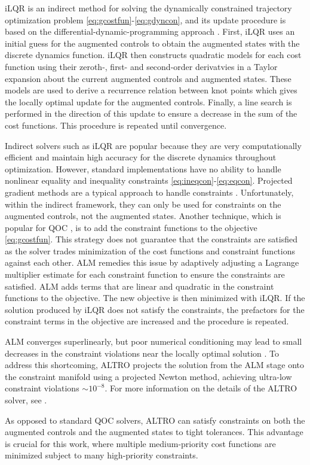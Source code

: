 iLQR is an indirect method
for solving the dynamically constrained
trajectory optimization problem \eqref{eq:gcostfun}-\eqref{eq:gdyncon},
and its update procedure is based on the differential-dynamic-programming approach
\cite{mayne1966a}.
First, iLQR uses an initial guess for the augmented controls to obtain the augmented
states with the discrete dynamics function.
iLQR then constructs quadratic models for each cost function using
their zeroth-, first- and second-order derivatvies in a Taylor expansion
about the current augmented controls and augmented states.
These models are used to derive a recurrence relation between knot points
which gives the locally optimal update for the augmented controls.
Finally, a line search \cite{zhang2006global}
is performed in the direction of this update to ensure a
decrease in the sum of the cost functions. This procedure
is repeated until convergence.

Indirect solvers such as iLQR are popular
because they are very computationally efficient and maintain
high accuracy for the discrete dynamics throughout optimization.
However, standard implementations have no ability to handle
nonlinear equality and inequality
constraints \eqref{eq:ineqcon}-\eqref{eq:eqcon}.
Projected gradient methods are a typical approach
to handle constraints
\cite{clarkson2010coresets, hauswirth2016projected, morzhin2019minimal,
  nikolskii2007convergence}. Unfortunately, within the indirect framework,
they can only be used for constraints on the augmented controls,
not the augmented states.
Another technique, which is popular for QOC \cite{leung2017speedup},
is to add the constraint functions to the objective
\eqref{eq:gcostfun}. 
This strategy does not guarantee that the constraints
are satisfied as the solver trades
minimization of the cost functions and constraint functions against each other.
ALM remedies this issue by adaptively adjusting a Lagrange multiplier estimate
for each constraint function to ensure the constraints are satisfied.
ALM adds terms that are linear and quadratic in the constraint functions
to the objective. The new objective is then minimized with
iLQR. If the solution produced by iLQR does not satisfy the constraints,
the prefactors for the constraint terms in the objective are increased
and the procedure is repeated.

ALM converges superlinearly, but poor numerical conditioning may lead
to small decreases in the constraint violations near the locally optimal solution
\cite{bertsekas1996constrained}.
To address this shortcoming, ALTRO
projects the solution from the ALM stage onto the constraint manifold using
a projected Newton method, achieving ultra-low
constraint violations $\sim 10^{-8}$.
For more information on the details of the ALTRO
solver, see \cite{howell2019altro, Jackson2020altroc}.

As opposed to standard QOC solvers, ALTRO
can satisfy constraints
on both the augmented controls and the augmented states to tight tolerances.
This advantage is crucial for this work, where multiple medium-priority cost functions
are minimized subject to many high-priority constraints.

